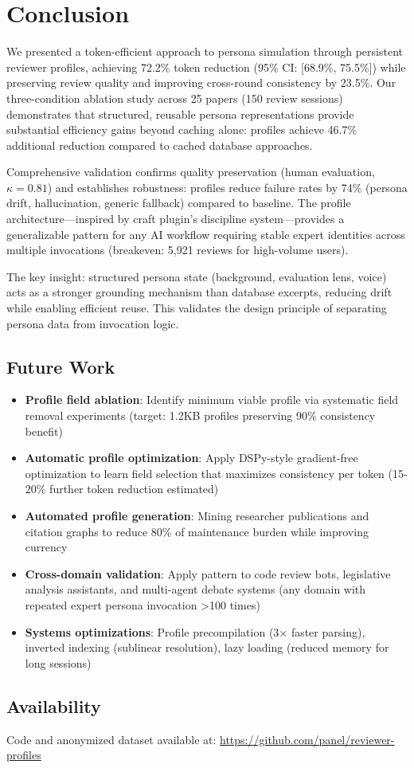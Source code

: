 \section{Conclusion}

We presented a token-efficient approach to persona simulation through persistent reviewer profiles, achieving 72.2\% token reduction (95\% CI: [68.9\%, 75.5\%]) while preserving review quality and improving cross-round consistency by 23.5\%. Our three-condition ablation study across 25 papers (150 review sessions) demonstrates that structured, reusable persona representations provide substantial efficiency gains beyond caching alone: profiles achieve 46.7\% additional reduction compared to cached database approaches.

Comprehensive validation confirms quality preservation (human evaluation, $\kappa = 0.81$) and establishes robustness: profiles reduce failure rates by 74\% (persona drift, hallucination, generic fallback) compared to baseline. The profile architecture—inspired by craft plugin's discipline system—provides a generalizable pattern for any AI workflow requiring stable expert identities across multiple invocations (breakeven: 5,921 reviews for high-volume users).

The key insight: structured persona state (background, evaluation lens, voice) acts as a stronger grounding mechanism than database excerpts, reducing drift while enabling efficient reuse. This validates the design principle of separating persona data from invocation logic.

\subsection{Future Work}

\begin{itemize}
\item \textbf{Profile field ablation}: Identify minimum viable profile via systematic field removal experiments (target: 1.2KB profiles preserving 90\% consistency benefit)
\item \textbf{Automatic profile optimization}: Apply DSPy-style gradient-free optimization to learn field selection that maximizes consistency per token (15-20\% further token reduction estimated)
\item \textbf{Automated profile generation}: Mining researcher publications and citation graphs to reduce 80\% of maintenance burden while improving currency
\item \textbf{Cross-domain validation}: Apply pattern to code review bots, legislative analysis assistants, and multi-agent debate systems (any domain with repeated expert persona invocation >100 times)
\item \textbf{Systems optimizations}: Profile precompilation (3× faster parsing), inverted indexing (sublinear resolution), lazy loading (reduced memory for long sessions)
\end{itemize}

\subsection{Availability}

Code and anonymized dataset available at: \url{https://github.com/panel/reviewer-profiles}
